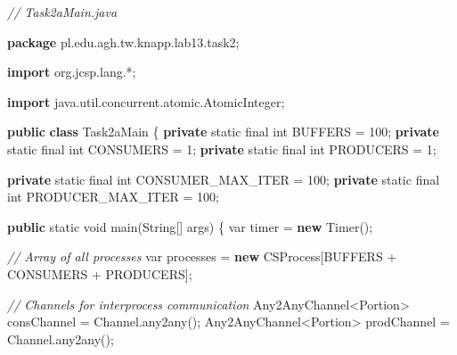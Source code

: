 \documentclass[11pt]{article}
\newenvironment{Shaded}{}{}
\newcommand{\KeywordTok}[1]{\textcolor[rgb]{0.00,0.44,0.13}{\textbf{{#1}}}}
\newcommand{\DataTypeTok}[1]{\textcolor[rgb]{0.56,0.13,0.00}{{#1}}}
\newcommand{\DecValTok}[1]{\textcolor[rgb]{0.25,0.63,0.44}{{#1}}}
\newcommand{\CommentTok}[1]{\textcolor[rgb]{0.38,0.63,0.69}{\textit{{#1}}}}
\newcommand{\FunctionTok}[1]{\textcolor[rgb]{0.02,0.16,0.49}{{#1}}}
\newcommand{\NormalTok}[1]{{#1}}
\newcommand{\ImportTok}[1]{{#1}}
\newcommand{\OperatorTok}[1]{\textcolor[rgb]{0.40,0.40,0.40}{{#1}}}
\newcommand{\BuiltInTok}[1]{{#1}}
\begin{document}
    \begin{Shaded}
\begin{Highlighting}[]
\CommentTok{// Task2aMain.java}

\KeywordTok{package}\ImportTok{ pl}\OperatorTok{.}\ImportTok{edu}\OperatorTok{.}\ImportTok{agh}\OperatorTok{.}\ImportTok{tw}\OperatorTok{.}\ImportTok{knapp}\OperatorTok{.}\ImportTok{lab13}\OperatorTok{.}\ImportTok{task2}\OperatorTok{;}

\KeywordTok{import} \ImportTok{org}\OperatorTok{.}\ImportTok{jcsp}\OperatorTok{.}\ImportTok{lang}\OperatorTok{.*;}

\KeywordTok{import} \ImportTok{java}\OperatorTok{.}\ImportTok{util}\OperatorTok{.}\ImportTok{concurrent}\OperatorTok{.}\ImportTok{atomic}\OperatorTok{.}\ImportTok{AtomicInteger}\OperatorTok{;}

\KeywordTok{public} \KeywordTok{class}\NormalTok{ Task2aMain }\OperatorTok{\{}
    \KeywordTok{private} \DataTypeTok{static} \DataTypeTok{final} \DataTypeTok{int}\NormalTok{ BUFFERS }\OperatorTok{=} \DecValTok{100}\OperatorTok{;}
    \KeywordTok{private} \DataTypeTok{static} \DataTypeTok{final} \DataTypeTok{int}\NormalTok{ CONSUMERS }\OperatorTok{=} \DecValTok{1}\OperatorTok{;}
    \KeywordTok{private} \DataTypeTok{static} \DataTypeTok{final} \DataTypeTok{int}\NormalTok{ PRODUCERS }\OperatorTok{=} \DecValTok{1}\OperatorTok{;}

    \KeywordTok{private} \DataTypeTok{static} \DataTypeTok{final} \DataTypeTok{int}\NormalTok{ CONSUMER\_MAX\_ITER }\OperatorTok{=} \DecValTok{100}\OperatorTok{;}
    \KeywordTok{private} \DataTypeTok{static} \DataTypeTok{final} \DataTypeTok{int}\NormalTok{ PRODUCER\_MAX\_ITER }\OperatorTok{=} \DecValTok{100}\OperatorTok{;}

    \KeywordTok{public} \DataTypeTok{static} \DataTypeTok{void} \FunctionTok{main}\OperatorTok{(}\BuiltInTok{String}\OperatorTok{[]}\NormalTok{ args}\OperatorTok{)} \OperatorTok{\{}
        \DataTypeTok{var}\NormalTok{ timer }\OperatorTok{=} \KeywordTok{new} \BuiltInTok{Timer}\OperatorTok{();}

        \CommentTok{// Array of all processes}
        \DataTypeTok{var}\NormalTok{ processes }\OperatorTok{=} \KeywordTok{new}\NormalTok{ CSProcess}\OperatorTok{[}\NormalTok{BUFFERS }\OperatorTok{+}\NormalTok{ CONSUMERS }\OperatorTok{+}\NormalTok{ PRODUCERS}\OperatorTok{];}

        \CommentTok{// Channels for interprocess communication}
\NormalTok{        Any2AnyChannel}\OperatorTok{\textless{}}\NormalTok{Portion}\OperatorTok{\textgreater{}}\NormalTok{ consChannel }\OperatorTok{=} \BuiltInTok{Channel}\OperatorTok{.}\FunctionTok{any2any}\OperatorTok{();}
\NormalTok{        Any2AnyChannel}\OperatorTok{\textless{}}\NormalTok{Portion}\OperatorTok{\textgreater{}}\NormalTok{ prodChannel }\OperatorTok{=} \BuiltInTok{Channel}\OperatorTok{.}\FunctionTok{any2any}\OperatorTok{();}


\end{Highlighting}
\end{Shaded}
\end{document}
